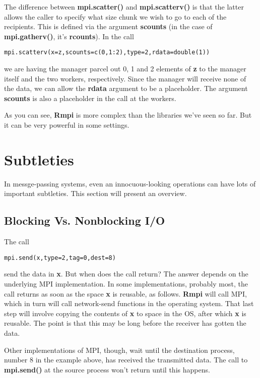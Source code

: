 The difference between {\bf mpi.scatter()} and {\bf mpi.scatterv()} is
that the latter allows the caller to specify what size chunk we wish to
go to each of the recipients.  This is defined via the argument {\bf
scounts} (in the case of {\bf mpi.gatherv()}, it's {\bf rcounts}).  In
the call

\begin{lstlisting}
mpi.scatterv(x=z,scounts=c(0,1:2),type=2,rdata=double(1))
\end{lstlisting}

we are having the manager parcel out 0, 1 and 2 elements of {\bf z} to
the manager itself and the two workers, respectively.  Since the manager
will receive none of the data, we can allow the {\bf rdata} argument to
be a placeholder.  The argument {\bf scounts} is also a placeholder in
the call at the workers.

As you can see, {\bf Rmpi} is more complex than the libraries we've seen
so far.  But it can be very powerful in some settings.

\section{Subtleties}

In messge-passing systems, even an innocuous-looking operations
can have lots of important subtleties.  This section will present an
overview.

\subsection{Blocking Vs. Nonblocking I/O}
\label{nonblock}

The call

\begin{lstlisting}
mpi.send(x,type=2,tag=0,dest=8)
\end{lstlisting}

send the data in {\bf x}.  But when does the call return?  The answer
depends on the underlying MPI implementation.  In some implementations,
probably most, the call returns as soon as the space {\bf x} is
reusable, as follows.  {\bf Rmpi} will call MPI, which in turn will call
network-send functions in the operating system.  That last step will
involve copying the contents of {\bf x} to space in the OS, after which
{\bf x} is reusable.  The point is that this may be long before the
receiver has gotten the data.

Other implementations of MPI, though, wait until the destination
process, number 8 in the example above, has received the transmitted
data.  The call to {\bf mpi.send()} at the source process won't return
until this happens.

